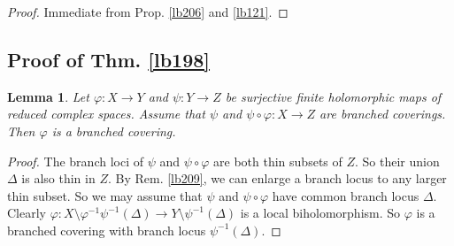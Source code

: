 \documentclass[12pt,b5paper,notitlepage]{report}
\theoremstyle{definition}
\theoremstyle{plain}
\newtheorem{lm}[df]{Lemma}
\numberwithin{equation}{section}
\begin{document}
\begin{proof}
Immediate from Prop. \ref{lb206} and \ref{lb121}.
\end{proof}



\subsection{Proof of Thm. \ref{lb198}}




\begin{lm}\label{lb211}
Let $\varphi:X\rightarrow Y$ and $\psi:Y\rightarrow Z$ be surjective finite holomorphic maps of reduced complex spaces. Assume that $\psi$ and $\psi\circ\varphi:X\rightarrow Z$ are branched coverings. Then $\varphi$ is a branched covering.
\end{lm}


\begin{proof}
The branch loci of $\psi$ and $\psi\circ\varphi$ are both thin subsets of $Z$. So their union $\Delta$ is also thin in $Z$. By Rem. \ref{lb209}, we can enlarge  a branch locus to any larger thin subset. So we may assume that $\psi$ and $\psi\circ\varphi$ have common branch locus $\Delta$. Clearly $\varphi:X\setminus\varphi^{-1}\psi^{-1}(\Delta)\rightarrow Y\setminus \psi^{-1}(\Delta)$ is a local biholomorphism. So $\varphi$ is a branched covering with branch locus $\psi^{-1}(\Delta)$.
\end{proof}
\end{document}

